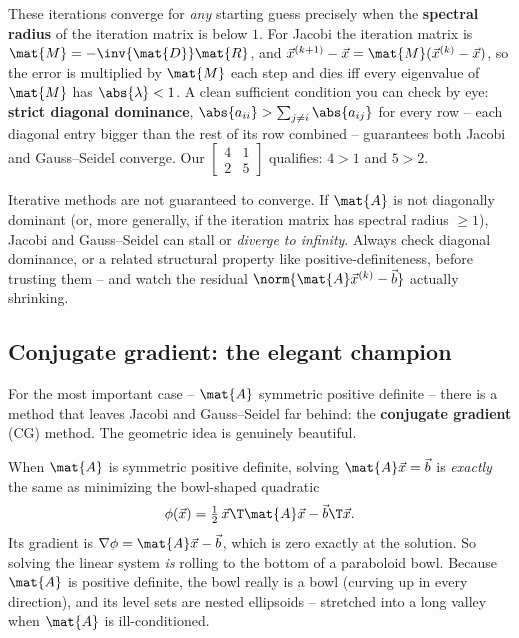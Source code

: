 \begin{formalbox}
These iterations converge for \emph{any} starting guess precisely when the
\textbf{spectral radius} of the iteration matrix is below $1$. For Jacobi the iteration
matrix is $\mat{M}=-\inv{\mat{D}}\mat{R}$, and $\vec{x}^{(k+1)}-\vec{x} =
\mat{M}(\vec{x}^{(k)}-\vec{x})$, so the error is multiplied by $\mat{M}$ each step and
dies iff every eigenvalue of $\mat{M}$ has $\abs{\lambda}<1$. A clean sufficient
condition you can check by eye: \textbf{strict diagonal dominance},
$\abs{a_{ii}} > \sum_{j\ne i}\abs{a_{ij}}$ for every row -- each diagonal entry bigger
than the rest of its row combined -- guarantees both Jacobi and Gauss--Seidel converge.
Our $\left[\begin{smallmatrix}4&1\\2&5\end{smallmatrix}\right]$ qualifies: $4>1$ and
$5>2$.
\end{formalbox}

\begin{trapbox}
Iterative methods are not guaranteed to converge. If $\mat{A}$ is not diagonally
dominant (or, more generally, if the iteration matrix has spectral radius $\ge 1$),
Jacobi and Gauss--Seidel can stall or \emph{diverge to infinity}. Always check
diagonal dominance, or a related structural property like positive-definiteness, before
trusting them -- and watch the residual $\norm{\mat{A}\vec{x}^{(k)}-\vec{b}}$ actually
shrinking.
\end{trapbox}

\subsection{Conjugate gradient: the elegant champion}

For the most important case -- $\mat{A}$ symmetric positive definite -- there is a
method that leaves Jacobi and Gauss--Seidel far behind: the \textbf{conjugate gradient}
(CG) method. The geometric idea is genuinely beautiful.

When $\mat{A}$ is symmetric positive definite, solving $\mat{A}\vec{x}=\vec{b}$ is
\emph{exactly} the same as minimizing the bowl-shaped quadratic
\[
  \phi(\vec{x}) = \tfrac12\,\vec{x}\T\mat{A}\vec{x} - \vec{b}\T\vec{x}.
\]
Its gradient is $\nabla\phi = \mat{A}\vec{x}-\vec{b}$, which is zero exactly at the
solution. So solving the linear system \emph{is} rolling to the bottom of a
paraboloid bowl. Because $\mat{A}$ is positive definite, the bowl really is a bowl
(curving up in every direction), and its level sets are nested ellipsoids -- stretched
into a long valley when $\mat{A}$ is ill-conditioned.

